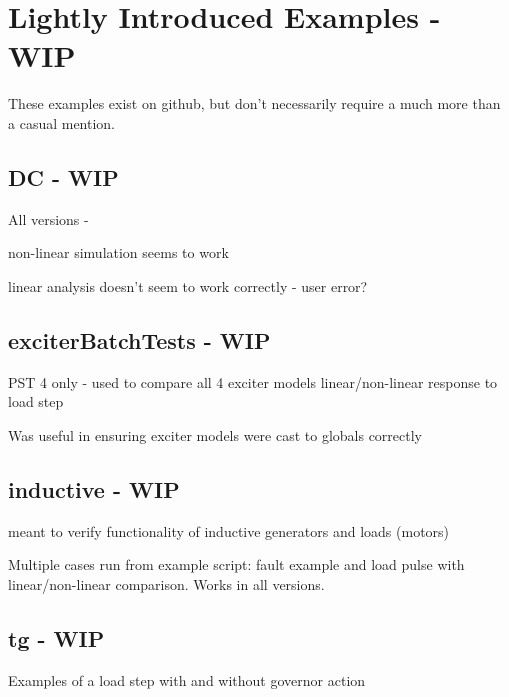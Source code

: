 \pagebreak
\section{Lightly Introduced Examples - WIP}
These examples exist on github, but don't necessarily require a much more than a casual mention.
\subsection{DC - WIP}
All versions - 

non-linear simulation seems to work

linear analysis doesn't seem to work correctly - user error?

\subsection{exciterBatchTests - WIP}
PST 4 only - used to compare all 4 exciter models linear/non-linear response to load step

Was useful in ensuring exciter models were cast to globals correctly

\subsection{inductive - WIP}
meant to verify functionality of inductive generators and loads (motors)

Multiple cases run from example script: fault example and load pulse with linear/non-linear comparison.
Works in all versions.

\subsection{tg - WIP}
Examples of a load step with and without governor action


